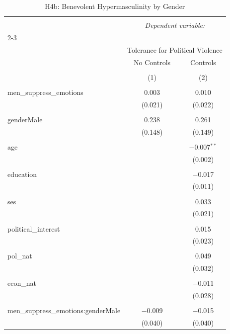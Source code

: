 
\begin{table}[!htbp] \centering 
  \caption{H4b: Benevolent Hypermasculinity by Gender} 
  \label{} 
\begin{tabular}{@{\extracolsep{5pt}}lcc} 
\\[-1.8ex]\hline 
\hline \\[-1.8ex] 
 & \multicolumn{2}{c}{\textit{Dependent variable:}} \\ 
\cline{2-3} 
\\[-1.8ex] & \multicolumn{2}{c}{Tolerance for Political Violence} \\ 
 & No Controls & Controls \\ 
\\[-1.8ex] & (1) & (2)\\ 
\hline \\[-1.8ex] 
 men\_suppress\_emotions & 0.003 & 0.010 \\ 
  & (0.021) & (0.022) \\ 
  & & \\ 
 genderMale & 0.238 & 0.261 \\ 
  & (0.148) & (0.149) \\ 
  & & \\ 
 age &  & $-$0.007$^{**}$ \\ 
  &  & (0.002) \\ 
  & & \\ 
 education &  & $-$0.017 \\ 
  &  & (0.011) \\ 
  & & \\ 
 ses &  & 0.033 \\ 
  &  & (0.021) \\ 
  & & \\ 
 political\_interest &  & 0.015 \\ 
  &  & (0.023) \\ 
  & & \\ 
 pol\_nat &  & 0.049 \\ 
  &  & (0.032) \\ 
  & & \\ 
 econ\_nat &  & $-$0.011 \\ 
  &  & (0.028) \\ 
  & & \\ 
 men\_suppress\_emotions:genderMale & $-$0.009 & $-$0.015 \\ 
  & (0.040) & (0.040) \\ 

\end{tabular}
\end{table}
